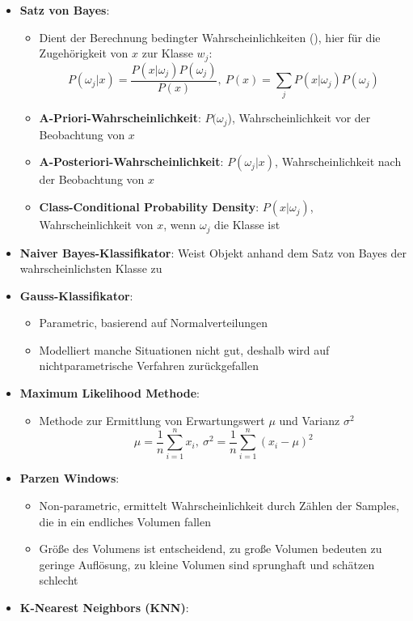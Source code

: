 \begin{itemize}
	\item \textbf{Satz von Bayes}:
	\begin{itemize}
		\item Dient der Berechnung bedingter Wahrscheinlichkeiten (), hier für die Zugehörigkeit von $x$ zur Klasse $w_j$:
		$$
			P(\omega_j | x) = \frac{P(x|\omega_j)P(\omega_j)}{P(x)},\ P(x) = \sum_j P(x|\omega_j)P(\omega_j)
		$$
		\item \textbf{A-Priori-Wahrscheinlichkeit}: $P(\omega_j$), Wahrscheinlichkeit vor der Beobachtung von $x$
		\item \textbf{A-Posteriori-Wahrscheinlichkeit}: $P(\omega_j | x)$, Wahrscheinlichkeit nach der Beobachtung von $x$
		\item \textbf{Class-Conditional Probability Density}: $P(x | \omega_j)$, Wahrscheinlichkeit von $x$, wenn $\omega_j$ die Klasse ist
	\end{itemize}
	\item \textbf{Naiver Bayes-Klassifikator}: Weist Objekt anhand dem Satz von Bayes der wahrscheinlichsten Klasse zu
	\newpage
	\item \textbf{Gauss-Klassifikator}:
	\begin{itemize}
		\item Parametric, basierend auf Normalverteilungen
		\item Modelliert manche Situationen nicht gut, deshalb wird auf nichtparametrische Verfahren zurückgefallen
	\end{itemize}
	\item \textbf{Maximum Likelihood Methode}:
	\begin{itemize}
		\item Methode zur Ermittlung von Erwartungswert $\mu$ und Varianz $\sigma^2$
		$$
			\mu = \frac{1}{n}\sum^n_{i=1}x_i,\ \sigma^2 = \frac{1}{n}\sum^n_{i=1}(x_i - \mu)^2
		$$
	\end{itemize}
	\item \textbf{Parzen Windows}:
	\begin{itemize}
		\item Non-parametric, ermittelt Wahrscheinlichkeit durch Zählen der Samples, die in ein endliches Volumen fallen
		\item Größe des Volumens ist entscheidend, zu große Volumen bedeuten zu geringe Auflösung, zu kleine Volumen sind sprunghaft und schätzen schlecht
	\end{itemize}
	\item \textbf{K-Nearest Neighbors (KNN)}:
	\begin{itemize}

\end{itemize}
\end{itemize}
